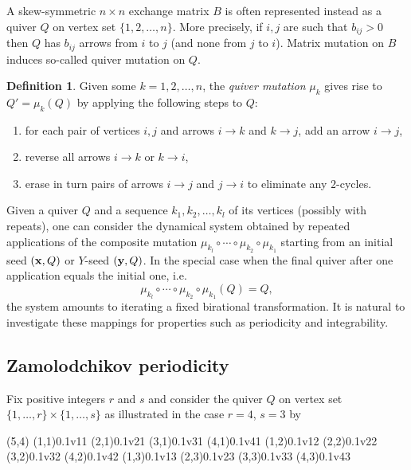\documentclass{amsart}
\theoremstyle{definition}
\newtheorem{definition}[theorem]{Definition}
\theoremstyle{remark}
\numberwithin{equation}{section}
\newcommand{\x}{{\bf x}}
\newcommand{\y}{{\bf y}}
\begin{document}
	A skew-symmetric $n\times n$ exchange matrix $B$ is often represented instead as a quiver $Q$ on vertex set $\{1,2,\ldots, n\}$.  More precisely, if $i,j$ are such that $b_{ij}>0$ then $Q$ has $b_{ij}$ arrows from $i$ to $j$ (and none from $j$ to $i$).  Matrix mutation on $B$ induces so-called quiver mutation on $Q$.
	
	\begin{definition}
		Given some $k=1,2,\ldots, n$, the \emph{quiver mutation} $\mu_k$ gives rise to $Q' = \mu_k(Q)$ by applying the following steps to $Q$:
		\begin{enumerate}
		\item for each pair of vertices $i,j$ and arrows $i\to k$ and $k \to j$, add an arrow $i \to j$,
		\item reverse all arrows $i \to k$ or $k \to i$,
		\item erase in turn pairs of arrows $i \to j$ and $j \to i$ to eliminate any $2$-cycles.
		\end{enumerate}
	\end{definition}
	
	Given a quiver $Q$ and a sequence $k_1,k_2,\ldots, k_l$ of its vertices (possibly with repeats), one can consider the dynamical system obtained by repeated applications of the composite mutation $\mu_{k_l} \circ \cdots \circ \mu_{k_2} \circ \mu_{k_1}$ starting from an initial seed $(\x, Q)$ or $Y$-seed $(\y,Q)$.  In the special case when the final quiver after one application equals the initial one, i.e.
	\begin{displaymath}
		\mu_{k_l} \circ \cdots \circ \mu_{k_2} \circ \mu_{k_1}(Q) = Q,
	\end{displaymath}
	the system amounts to iterating a fixed birational transformation.  It is natural to investigate these mappings for properties such as periodicity and integrability.

\subsection{Zamolodchikov periodicity}
	Fix positive integers $r$ and $s$ and consider the quiver $Q$ on vertex set $\{1,\ldots, r \} \times \{1,\ldots, s\}$ as illustrated in the case $r=4$, $s=3$ by
	
	\begin{pspicture}(5,4)
		\cnode(1,1){0.1}{v11}
		\cnode(2,1){0.1}{v21}
		\cnode(3,1){0.1}{v31}
		\cnode(4,1){0.1}{v41}
		\cnode(1,2){0.1}{v12}
		\cnode(2,2){0.1}{v22}
		\cnode(3,2){0.1}{v32}
		\cnode(4,2){0.1}{v42}
		\cnode(1,3){0.1}{v13}
		\cnode(2,3){0.1}{v23}
		\cnode(3,3){0.1}{v33}
		\cnode(4,3){0.1}{v43}
	\end{pspicture}
	
\end{document}
